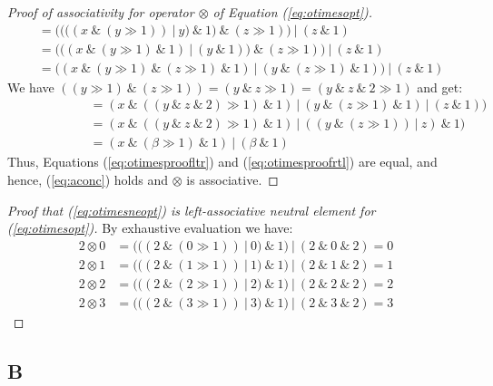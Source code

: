 \begin{proof}[Proof of associativity for operator $\otimes$ of Equation (\ref{eq:otimesopt})]
\begin{align}
               &= ((((x~\&~(y \gg 1))~|~y)~\&~1)~\&~(z \gg 1))~|~(z~\&~1) \\
               &= (((x~\&~(y \gg 1)~\&~1)~|~(y~\&~1))~\&~(z \gg 1))~|~(z~\&~1) \\
               &= ((x~\&~(y \gg 1)~\&~(z \gg 1)~\&~1)~|~(y~\&~(z \gg 1)~\&~1))~|~(z~\&~1)
\end{align}
We have $((y \gg 1)~\&~(z \gg 1)) = (y~\&~z \gg 1) = (y~\&~z~\&~2 \gg 1)$ and get:
\begin{align}
  &= (x~\&~((y~\&~z~\&~2) \gg 1)~\&~1)~|~(y~\&~(z \gg 1)~\&~1)~|~(z~\&~1))\\
  \phantom{((\alpha~\&~1)\&}&= (x~\&~((y~\&~z~\&~2) \gg 1)~\&~1)~|~((y~\&~(z \gg 1))~|~z)~\&~1)\\
  &= (x~\&~(\beta \gg 1)~\&~1)~|~(\beta~\&~1)
\end{align}
Thus, Equations (\ref{eq:otimesproofltr}) and (\ref{eq:otimesproofrtl}) are equal, and hence, (\ref{eq:aconc}) holds and $\otimes$ is associative.
\end{proof}

\begin{proof}[Proof that (\ref{eq:otimesneopt}) is left-associative neutral element for (\ref{eq:otimesopt})] By exhaustive evaluation we have:
\begin{align}
  \label{eq:otimesneproof}
  2 \otimes 0 &= (((2~\&~(0 \gg 1))~|~0)~\&~1)~|~(2~\&~0~\&~2) = 0 \\
  2 \otimes 1 &= (((2~\&~(1 \gg 1))~|~1)~\&~1)~|~(2~\&~1~\&~2) = 1 \\
  2 \otimes 2 &= (((2~\&~(2 \gg 1))~|~2)~\&~1)~|~(2~\&~2~\&~2) = 2 \\
  2 \otimes 3 &= (((2~\&~(3 \gg 1))~|~3)~\&~1)~|~(2~\&~3~\&~2) = 3
\end{align}
\end{proof}


\subsection*{B}
\label{app:B}


